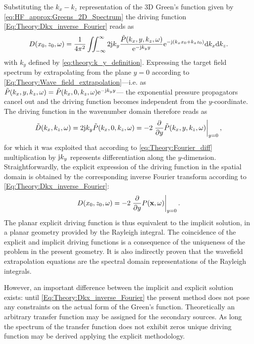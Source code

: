 Substituting the $k_x-k_z$ representation of the 3D Green's function given by \eqref{eq:HF_approx:Greens_2D_Spectrum} the driving function \eqref{Eq:Theory:Dkx_inverse_Fourier} reads as
\begin{equation}
D(x_0,z_0,\omega) = \frac{1}{4\pi^2} \iint_{-\infty}^{\infty} 2\mathrm{j} k_y \frac{\tilde{P}(k_x,y,k_z, \omega)}{ \mathrm{e}^{ -\mathrm{j} k_y  y  } } \mathrm{e}^{-\mathrm{j} (k_x x_0 + k_z z_0)} \mathrm{d} k_x \mathrm{d} k_z.
\end{equation}
with $k_y$ defined by \eqref{eq:theory:k_y_definition}.	
Expressing the target field spectrum by extrapolating from the plane $y = 0$ according to \eqref{Eq:Theory:Wave_field_extrapolation}---i.e. as 
$
\tilde{P}(k_x,y,k_z, \omega) = \tilde{P}(k_x,0,k_z, \omega)  \mathrm{e}^{ -\mathrm{j} k_y  y }
$---
the exponential pressure propagators cancel out and the driving function becomes independent from the $y$-coordinate. 
The driving function in the wavenumber domain therefore reads as
\begin{equation}
\tilde{D}(k_x,k_z,\omega) = 2\mathrm{j} k_y \tilde{P}(k_x,0,k_z,\omega) = -2 \left. \frac{\partial}{\partial y} \tilde{P}(k_x,y,k_z,\omega) \right|_{y = 0},
\label{Eq:Theory:Planar_explicit_driv_fun}
\end{equation}
for which it was exploited that according to \eqref{eq:Theory:Fourier_diff} multiplication by $\mathrm{j} k_y$ represents differentiation along the $y$-dimension.
Straightforwardly, the explicit expression of the driving function in the spatial domain is obtained by the corresponding inverse Fourier transform according to \eqref{Eq:Theory:Dkx_inverse_Fourier}:
\begin{equation}
D(x_0,z_0,\omega) = -2 \left. \frac{\partial}{\partial y} P(\mathbf{x},\omega) \right|_{y = 0}.
\label{Eq:Theory:Planar_explicit_driv_fun_spatial}
\end{equation}
The planar explicit driving function is thus equivalent to the implicit solution, in a planar geometry provided by the Rayleigh integral.
The coincidence of the explicit and implicit driving functions is a consequence of the uniqueness of the problem in the present geometry.
It is also indirectly proven that the wavefield extrapolation equations are the spectral domain representations of the Rayleigh integrals.

However, an important difference between the implicit and explicit solution exists: until \eqref{Eq:Theory:Dkx_inverse_Fourier} the present method does not pose any constraints on the actual form of the Green's function. 
Theoretically an arbitrary transfer function may be assigned for the secondary sources. 
As long the spectrum of the transfer function does not exhibit zeros unique driving function may be derived applying the explicit methodology.

